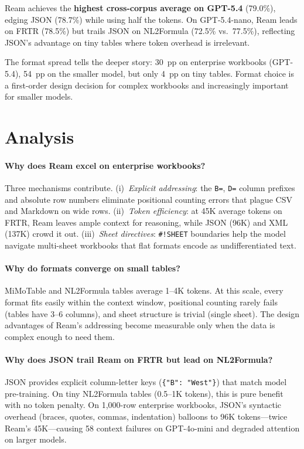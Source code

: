 \documentclass[11pt]{article}
\begin{document}
Ream achieves the \textbf{highest cross-corpus average on GPT-5.4} (79.0\%), edging JSON (78.7\%) while using half the tokens.
On GPT-5.4-nano, Ream leads on FRTR (78.5\%) but trails JSON on NL2Formula (72.5\% vs.\ 77.5\%), reflecting JSON's advantage on tiny tables where token overhead is irrelevant.

The format spread tells the deeper story: 30~pp on enterprise workbooks (GPT-5.4), 54~pp on the smaller model, but only 4~pp on tiny tables.
Format choice is a first-order design decision for complex workbooks and increasingly important for smaller models.

\section{Analysis}
\label{sec:analysis}

\paragraph{Why does Ream excel on enterprise workbooks?}
Three mechanisms contribute.
(i)~\emph{Explicit addressing}: the \texttt{B=}, \texttt{D=} column prefixes and absolute row numbers eliminate positional counting errors that plague CSV and Markdown on wide rows.
(ii)~\emph{Token efficiency}: at 45K average tokens on FRTR, Ream leaves ample context for reasoning, while JSON (96K) and XML (137K) crowd it out.
(iii)~\emph{Sheet directives}: \texttt{\#!SHEET} boundaries help the model navigate multi-sheet workbooks that flat formats encode as undifferentiated text.

\paragraph{Why do formats converge on small tables?}
MiMoTable and NL2Formula tables average 1--4K tokens.
At this scale, every format fits easily within the context window, positional counting rarely fails (tables have 3--6 columns), and sheet structure is trivial (single sheet).
The design advantages of Ream's addressing become measurable only when the data is complex enough to need them.

\paragraph{Why does JSON trail Ream on FRTR but lead on NL2Formula?}
JSON provides explicit column-letter keys (\texttt{\{"B": "West"\}}) that match model pre-training.
On tiny NL2Formula tables (0.5--1K tokens), this is pure benefit with no token penalty.
On 1,000-row enterprise workbooks, JSON's syntactic overhead (braces, quotes, commas, indentation) balloons to 96K tokens---twice Ream's 45K---causing 58 context failures on GPT-4o-mini and degraded attention on larger models.
\end{document}
